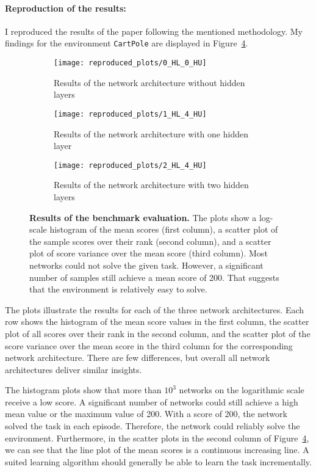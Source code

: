 \paragraph*{Reproduction of the results:} I reproduced the results of the paper following the mentioned methodology. My findings for the environment \verb|CartPole| are displayed in Figure~\ref{fig:plots_reproduced}.
\begin{figure}[h]
\centering
\begin{subfigure}{\textwidth}
  \centering
  \texttt{[image: reproduced\_plots/0\_HL\_0\_HU]}
    \caption{Results of the network architecture without hidden layers}
    \label{fig:plots_reproduced_first}
\end{subfigure}
\begin{subfigure}{\textwidth}
  \centering
  \texttt{[image: reproduced\_plots/1\_HL\_4\_HU]}
    \caption{Results of the network architecture with one hidden layer}
    \label{fig:plots_reproduced_second}
\end{subfigure}
\begin{subfigure}{\textwidth}
  \centering
  \texttt{[image: reproduced\_plots/2\_HL\_4\_HU]}
    \caption{Results of the network architecture with two hidden layers}
    \label{fig:plots_reproduced_third}
\end{subfigure}
\caption[Results of the benchmark evaluation]{
  \textbf{Results of the benchmark evaluation.}
  The plots show a log-scale histogram of the mean scores (first column), a scatter plot of the sample scores over their rank (second column), and a scatter plot of score variance over the mean score (third column). Most networks could not solve the given task. However, a significant number of samples still achieve a mean score of 200. That suggests that the environment is relatively easy to solve.
}
\label{fig:plots_reproduced}
\end{figure}
The plots illustrate the results for each of the three network architectures. Each row shows the histogram of the mean score values in the first column, the scatter plot of all scores over their rank in the second column, and the scatter plot of the score variance over the mean score in the third column for the corresponding network architecture. There are few differences, but overall all network architectures deliver similar insights.

The histogram plots show that more than $10^3$ networks on the logarithmic scale receive a low score. A significant number of networks could still achieve a high mean value or the maximum value of 200. With a score of 200, the network solved the task in each episode. Therefore, the network could reliably solve the environment. Furthermore, in the scatter plots in the second column of Figure~\ref{fig:plots_reproduced}, we can see that the line plot of the mean scores is a continuous increasing line. A suited learning algorithm should generally be able to learn the task incrementally.

